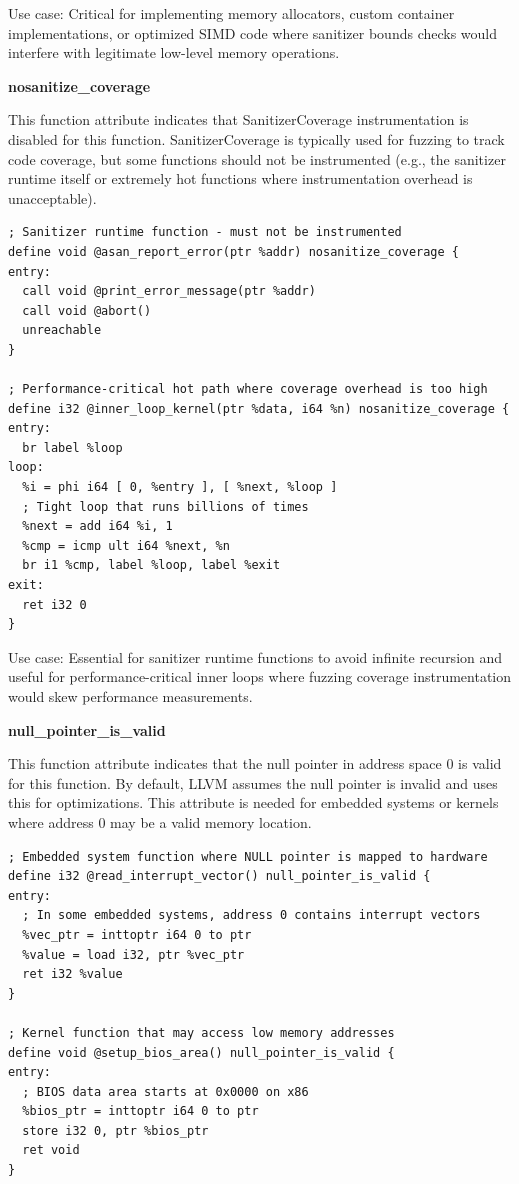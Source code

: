 Use case: Critical for implementing memory allocators, custom container implementations, or optimized SIMD code where sanitizer bounds checks would interfere with legitimate low-level memory operations.

\textbf{nosanitize\_coverage}

This function attribute indicates that SanitizerCoverage instrumentation is disabled for this function.
SanitizerCoverage is typically used for fuzzing to track code coverage, but some functions should not be instrumented (e.g., the sanitizer runtime itself or extremely hot functions where instrumentation overhead is unacceptable).

\begin{lstlisting}[style=ir]
; Sanitizer runtime function - must not be instrumented
define void @asan_report_error(ptr %addr) nosanitize_coverage {
entry:
  call void @print_error_message(ptr %addr)
  call void @abort()
  unreachable
}

; Performance-critical hot path where coverage overhead is too high
define i32 @inner_loop_kernel(ptr %data, i64 %n) nosanitize_coverage {
entry:
  br label %loop
loop:
  %i = phi i64 [ 0, %entry ], [ %next, %loop ]
  ; Tight loop that runs billions of times
  %next = add i64 %i, 1
  %cmp = icmp ult i64 %next, %n
  br i1 %cmp, label %loop, label %exit
exit:
  ret i32 0
}
\end{lstlisting}

Use case: Essential for sanitizer runtime functions to avoid infinite recursion and useful for performance-critical inner loops where fuzzing coverage instrumentation would skew performance measurements.

\textbf{null\_pointer\_is\_valid}

This function attribute indicates that the null pointer in address space 0 is valid for this function.
By default, LLVM assumes the null pointer is invalid and uses this for optimizations.
This attribute is needed for embedded systems or kernels where address 0 may be a valid memory location.

\begin{lstlisting}[style=ir]
; Embedded system function where NULL pointer is mapped to hardware
define i32 @read_interrupt_vector() null_pointer_is_valid {
entry:
  ; In some embedded systems, address 0 contains interrupt vectors
  %vec_ptr = inttoptr i64 0 to ptr
  %value = load i32, ptr %vec_ptr
  ret i32 %value
}

; Kernel function that may access low memory addresses
define void @setup_bios_area() null_pointer_is_valid {
entry:
  ; BIOS data area starts at 0x0000 on x86
  %bios_ptr = inttoptr i64 0 to ptr
  store i32 0, ptr %bios_ptr
  ret void
}
\end{lstlisting}

